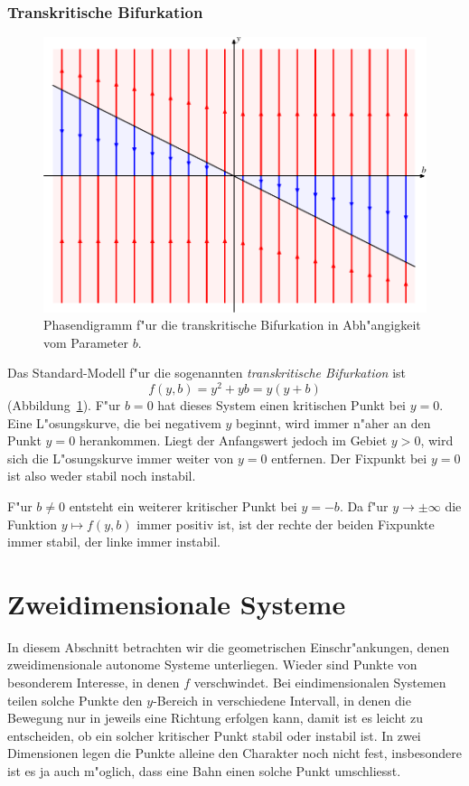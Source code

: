 \subsubsection{Transkritische Bifurkation}
\begin{figure}
\centering
\includegraphics[width=\hsize]{chapters/images/bifurkation-3.pdf}
\caption{Phasendigramm f"ur die transkritische Bifurkation in Abh"angigkeit
vom Parameter $b$.
\label{geometrie:transkritisch}}
\end{figure}
Das Standard-Modell f"ur die sogenannten {\em transkritische Bifurkation} ist 
\[
f(y,b)=y^2+yb = y(y+b)
\]
(Abbildung~\ref{geometrie:transkritisch}).
F"ur $b=0$ hat dieses System einen kritischen Punkt bei $y=0$.
Eine L"osungskurve, die bei negativem $y$ beginnt, wird immer n"aher
an den Punkt $y=0$ herankommen.
Liegt der Anfangswert jedoch im Gebiet $y>0$, wird sich die L"osungskurve
immer weiter von $y=0$ entfernen.
Der Fixpunkt bei $y=0$ ist also weder stabil noch instabil.

F"ur $b\ne 0$ entsteht ein weiterer kritischer Punkt bei $y=-b$.
Da f"ur $y\to\pm\infty$ die Funktion $y\mapsto f(y,b)$ immer positiv
ist, ist der rechte der beiden Fixpunkte immer stabil, der
linke immer instabil.


%
%
\section{Zweidimensionale Systeme}
In diesem Abschnitt betrachten wir die geometrischen Einschr"ankungen, denen
zweidimensionale autonome Systeme unterliegen.
Wieder sind Punkte von besonderem Interesse, in denen $f$ verschwindet.
Bei eindimensionalen Systemen teilen solche Punkte den $y$-Bereich in
verschiedene Intervall, in denen die Bewegung nur in jeweils
eine Richtung erfolgen kann, damit ist es leicht zu entscheiden,
ob ein solcher kritischer Punkt stabil oder instabil ist.
In zwei Dimensionen legen die Punkte alleine den Charakter noch nicht
fest, insbesondere ist es ja auch m"oglich, dass eine Bahn einen solche
Punkt umschliesst.

